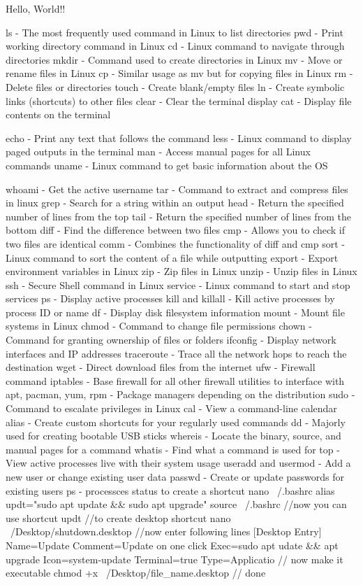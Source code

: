 \documentclass{article}  %
\begin{document}
 



Hello, World!! %

ls - The most frequently used command in Linux to list directories
pwd - Print working directory command in Linux
cd - Linux command to navigate through directories
mkdir - Command used to create directories in Linux
mv - Move or rename files in Linux
cp - Similar usage as mv but for copying files in Linux
rm - Delete files or directories
touch - Create blank/empty files
ln - Create symbolic links (shortcuts) to other files
clear - Clear the terminal display
cat - Display file contents on the terminal


echo - Print any text that follows the command
less - Linux command to display paged outputs in the terminal
man - Access manual pages for all Linux commands
uname - Linux command to get basic information about the OS

whoami - Get the active username
tar - Command to extract and compress files in linux
grep - Search for a string within an output
\vspace{2em}
head - Return the specified number of lines from the top
tail - Return the specified number of lines from the bottom
diff - Find the difference between two files
cmp - Allows you to check if two files are identical
comm - Combines the functionality of diff and cmp
sort - Linux command to sort the content of a file while outputting
export - Export environment variables in Linux
zip - Zip files in Linux
unzip - Unzip files in Linux
ssh - Secure Shell command in Linux
service - Linux command to start and stop services
ps - Display active processes
kill and killall - Kill active processes by process ID or name
df - Display disk filesystem information
mount - Mount file systems in Linux
chmod - Command to change file permissions
chown - Command for granting ownership of files or folders
ifconfig - Display network interfaces and IP addresses
traceroute - Trace all the network hops to reach the destination
wget - Direct download files from the internet
ufw - Firewall command
iptables - Base firewall for all other firewall utilities to interface with
apt, pacman, yum, rpm - Package managers depending on the distribution
sudo - Command to escalate privileges in Linux
cal - View a command-line calendar
alias - Create custom shortcuts for your regularly used commands
dd - Majorly used for creating bootable USB sticks
whereis - Locate the binary, source, and manual pages for a command
whatis - Find what a command is used for
top - View active processes live with their system usage
useradd and usermod - Add a new user or change existing user data
passwd - Create or update passwords for existing users
ps - processces status
to create a shortcut
nano ~/.bashrc
alias updt="sudo apt update \&\& sudo apt upgrade"
source ~/.bashrc
//now you can use shortcut updt
//to create desktop shortcut
nano ~/Desktop/shutdown.desktop
//now enter following lines
[Desktop Entry]
Name=Update
Comment=Update on one click
Exec=sudo apt udate \&\& apt upgrade
Icon=system-update
Terminal=true
Type=Applicatio
// now make it executable
chmod +x ~/Desktop/file_name.desktop
// done
\end{document}
